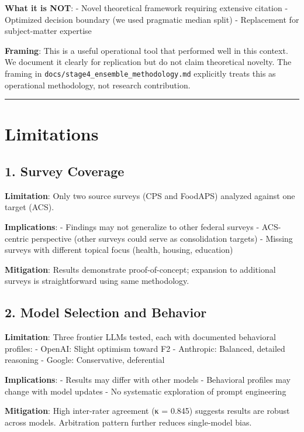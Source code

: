 \documentclass[
  letterpaper,
]{report}
\begin{document}
\textbf{What it is NOT}: - Novel theoretical framework requiring
extensive citation - Optimized decision boundary (we used pragmatic
median split) - Replacement for subject-matter expertise

\textbf{Framing}: This is a useful operational tool that performed well
in this context. We document it clearly for replication but do not claim
theoretical novelty. The framing in
\texttt{docs/stage4\_ensemble\_methodology.md} explicitly treats this as
operational methodology, not research contribution.

\begin{center}\rule{0.5\linewidth}{0.5pt}\end{center}

\section{Limitations}\label{limitations}

\subsection{1. Survey Coverage}\label{survey-coverage}

\textbf{Limitation}: Only two source surveys (CPS and FoodAPS) analyzed
against one target (ACS).

\textbf{Implications}: - Findings may not generalize to other federal
surveys - ACS-centric perspective (other surveys could serve as
consolidation targets) - Missing surveys with different topical focus
(health, housing, education)

\textbf{Mitigation}: Results demonstrate proof-of-concept; expansion to
additional surveys is straightforward using same methodology.

\subsection{2. Model Selection and
Behavior}\label{model-selection-and-behavior}

\textbf{Limitation}: Three frontier LLMs tested, each with documented
behavioral profiles: - OpenAI: Slight optimism toward F2 - Anthropic:
Balanced, detailed reasoning - Google: Conservative, deferential

\textbf{Implications}: - Results may differ with other models -
Behavioral profiles may change with model updates - No systematic
exploration of prompt engineering

\textbf{Mitigation}: High inter-rater agreement (κ = 0.845) suggests
results are robust across models. Arbitration pattern further reduces
single-model bias.
\end{document}
